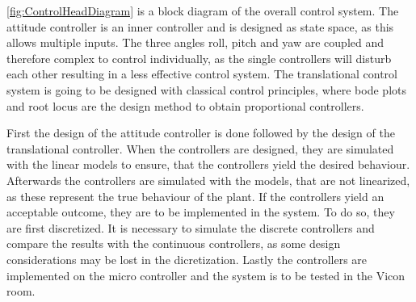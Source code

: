 \autoref{fig:ControlHeadDiagram} is a block diagram of the overall control system.
The attitude controller is an inner controller and is designed as state space, as this allows multiple inputs. The three angles roll, pitch and yaw are coupled and therefore complex to control individually, as the single controllers will disturb each other resulting in a less effective control system. The translational control system is going to be designed with classical control principles, where bode plots and root locus are the design method to obtain proportional controllers. 

First the design of the attitude controller is done followed by the design of the translational controller. 
When the controllers are designed, they are simulated with the linear models to ensure, that the controllers yield the desired behaviour. Afterwards the controllers are simulated with the models, that are not linearized, as these represent the true behaviour of the plant. If the controllers yield an acceptable outcome, they are to be implemented in the system. To do so, they are first discretized. It is necessary to simulate the discrete controllers and compare the results with the continuous controllers, as some design considerations may be lost in the dicretization. Lastly the controllers are implemented on the micro controller and the system is to be tested in the Vicon room. 